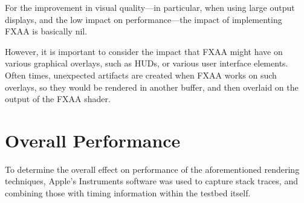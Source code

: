 \documentclass[11pt, oneside]{report}
\begin{document}
For the improvement in visual quality---in particular, when using large output displays, and the low impact on performance---the impact of implementing \gls{FXAA} is basically nil.

However, it is important to consider the impact that \gls{FXAA} might have on various graphical overlays, such as HUDs, or various user interface elements. Often times, unexpected artifacts are created when \gls{FXAA} works on such overlays, so they would be rendered in another buffer, and then overlaid on the output of the \gls{FXAA} shader.

\chapter{Overall Performance}
To determine the overall effect on performance of the aforementioned rendering techniques, Apple's Instruments software was used to capture stack traces, and combining those with timing information within the testbed itself.
\end{document}
